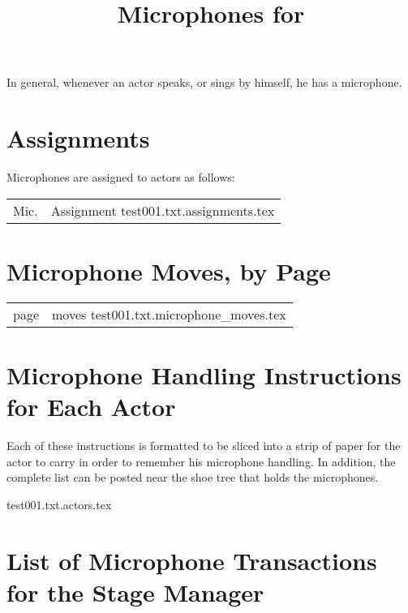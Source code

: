 \documentclass[letterpaper]{article}
\title{Microphones for {\ParameterShowName}}
\author{\ParameterDesigner}
\date{\ParameterDateNumeric}
\begin{document}
\maketitle
\tableofcontents
\newpage

In general, whenever an actor speaks, or sings by himself, he has a microphone.

\section {Assignments}
Microphones are assigned to actors as follows:

\begin{center}
\begin{longtable}{|l|m{7in}|}
\hline Mic. & Assignment \endhead \hline
 {test001.txt.assignments.tex}
\end{longtable}
\end{center}

\section {Microphone Moves, by Page}

\begin{center}
\begin{longtable}{|l|m{7in}|}
\hline page & moves \endhead \hline
 {test001.txt.microphone_moves.tex}
\end{longtable}
\end{center}

\section {Microphone Handling Instructions for Each Actor}

Each of these instructions is formatted to be sliced into a strip of paper
for the actor to carry in order to remember his microphone handling.
In addition, the complete list can be posted near the shoe tree that
holds the microphones.

\vskip 0.25in
{\setlength{\parindent}{0in}
 {test001.txt.actors.tex}
}

\section {List of Microphone Transactions for the Stage Manager}
\end{document}
